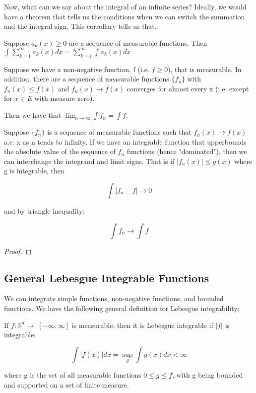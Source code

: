 \documentclass[class=article, crop=false]{standalone}
\begin{document}
		Now, what can we say about the integral of an infinite series? Ideally, we would have a theorem that tells us the conditions when we can switch the summation and the integral sign. This corrollary tells us that.

		\begin{corollary}
			Suppose $a_k(x) \ge 0$ are a sequence of measurable functions. Then $\int \sum_{k=1}^\infty a_k(x) dx = \sum_{k=1}^\infty \int a_k(x) dx$
		\end{corollary}

		\begin{lemma}
			Suppose we have a non-negative function, f (i.e. $f \ge 0$), that is measurable. In addition, there are a sequence of measurable functions $\{f_n\}$ with $f_n(x) \le f(x)$ and $f_n(x) \rightarrow f(x)$ converges for almost every x (i.e. except for $x \in E$ with measure zero). 

			Then we have that $\lim_{n\rightarrow\infty} \int f_n = \int f$.
		\end{lemma}

		\begin{theorem} 
		\label{thm:dominated_convergence}
			Suppose $\{f_n\}$ is a sequence of measurable functions such that $f_n(x) \rightarrow f(x)$ a.e. x as n tends to infinity. If we have an integrable function that upperbounds the absolute value of the sequence of $f_n$ functions (hence "dominated"), then we can interchange the integrand and limit signs. That is if $|f_n(x)| \le g(x)$ where g is integrable, then 

				$$\int | f_n - f | \rightarrow 0$$

			and by triangle inequality:

				$$\int f_n \rightarrow \int f$$
		\end{theorem}
		\begin{proof}

		\end{proof}
	\subsection{General Lebesgue Integrable Functions}
		We can integrate simple functions, non-negative functions, and bounded functions. We have the following general definition for Lebesgue integrability:

		\begin{definition}
		If $f: \mathbb{R}^d \rightarrow$ $[-\infty, \infty]$ is measurable, then it is Lebesgue integrable if $|f|$ is integrable:

			$$\int |f(x)| dx = \sup_g \int g(x) dx < \infty$$

		where g is the set of all measurable functions $0 \le g \le f$, with g being bounded and supported on a set of finite measure.
		\end{definition}
\end{document}
